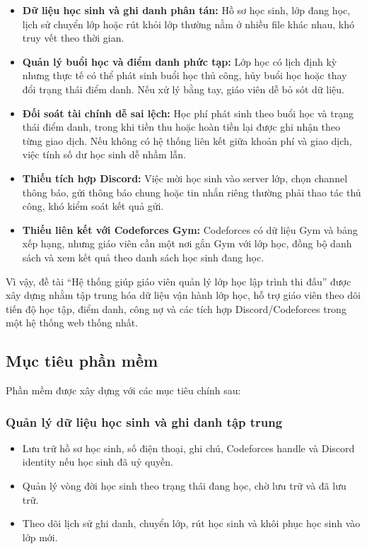 \documentclass[12pt,a4paper]{article}
\newcommand{\code}[1]{{\ttfamily\seqsplit{#1}}}
\begin{document}
\begin{itemize}[leftmargin=*]
\item \textbf{Dữ liệu học sinh và ghi danh phân tán:} Hồ sơ học sinh, lớp đang học, lịch sử chuyển lớp hoặc rút khỏi lớp thường nằm ở nhiều file khác nhau, khó truy vết theo thời gian.
\item \textbf{Quản lý buổi học và điểm danh phức tạp:} Lớp học có lịch định kỳ nhưng thực tế có thể phát sinh buổi học thủ công, hủy buổi học hoặc thay đổi trạng thái điểm danh. Nếu xử lý bằng tay, giáo viên dễ bỏ sót dữ liệu.
\item \textbf{Đối soát tài chính dễ sai lệch:} Học phí phát sinh theo buổi học và trạng thái điểm danh, trong khi tiền thu hoặc hoàn tiền lại được ghi nhận theo từng giao dịch. Nếu không có hệ thống liên kết giữa khoản phí và giao dịch, việc tính số dư học sinh dễ nhầm lẫn.
\item \textbf{Thiếu tích hợp Discord:} Việc mời học sinh vào server lớp, chọn channel thông báo, gửi thông báo chung hoặc tin nhắn riêng thường phải thao tác thủ công, khó kiểm soát kết quả gửi.
\item \textbf{Thiếu liên kết với Codeforces Gym:} Codeforces có dữ liệu Gym và bảng xếp hạng, nhưng giáo viên cần một nơi gắn Gym với lớp học, đồng bộ danh sách \code{GymProblem} và xem kết quả theo danh sách học sinh đang học.
\end{itemize}

Vì vậy, đề tài ``Hệ thống giúp giáo viên quản lý lớp học lập trình thi đấu'' được xây dựng nhằm tập
trung hóa dữ liệu vận hành lớp học, hỗ trợ giáo viên theo dõi tiến độ học tập,
điểm danh, công nợ và các tích hợp Discord/Codeforces trong một hệ thống web
thống nhất.

\subsection{Mục tiêu phần mềm}

Phần mềm được xây dựng với các mục tiêu chính sau:

\subsubsection{Quản lý dữ liệu học sinh và ghi danh tập trung}

\begin{itemize}[leftmargin=*]
\item Lưu trữ hồ sơ học sinh, số điện thoại, ghi chú, Codeforces handle và Discord identity nếu học sinh đã uỷ quyền.
\item Quản lý vòng đời học sinh theo trạng thái đang học, chờ lưu trữ và đã lưu trữ.
\item Theo dõi lịch sử ghi danh, chuyển lớp, rút học sinh và khôi phục học sinh vào lớp mới.
\end{itemize}
\end{document}
